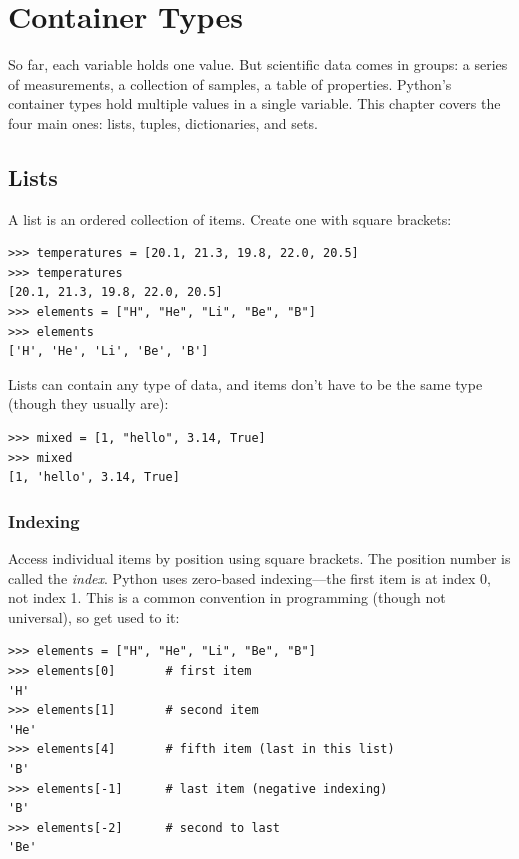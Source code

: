 
\chapter{Container Types}
\label{chap:containers}

So far, each variable holds one value. But scientific data comes in groups: a series of measurements, a collection of samples, a table of properties. Python's container types hold multiple values in a single variable. This chapter covers the four main ones: lists, tuples, dictionaries, and sets.

\section{Lists}
\label{sec:lists}

A list is an ordered collection of items. Create one with square brackets:

\begin{lstlisting}
>>> temperatures = [20.1, 21.3, 19.8, 22.0, 20.5]
>>> temperatures
[20.1, 21.3, 19.8, 22.0, 20.5]
>>> elements = ["H", "He", "Li", "Be", "B"]
>>> elements
['H', 'He', 'Li', 'Be', 'B']
\end{lstlisting}

Lists can contain any type of data, and items don't have to be the same type (though they usually are):

\begin{lstlisting}
>>> mixed = [1, "hello", 3.14, True]
>>> mixed
[1, 'hello', 3.14, True]
\end{lstlisting}

\subsection{Indexing}

Access individual items by position using square brackets. The position number is called the \emph{index}. Python uses zero-based indexing---the first item is at index 0, not index 1. This is a common convention in programming (though not universal), so get used to it:

\begin{lstlisting}
>>> elements = ["H", "He", "Li", "Be", "B"]
>>> elements[0]       # first item
'H'
>>> elements[1]       # second item
'He'
>>> elements[4]       # fifth item (last in this list)
'B'
>>> elements[-1]      # last item (negative indexing)
'B'
>>> elements[-2]      # second to last
'Be'
\end{lstlisting}


